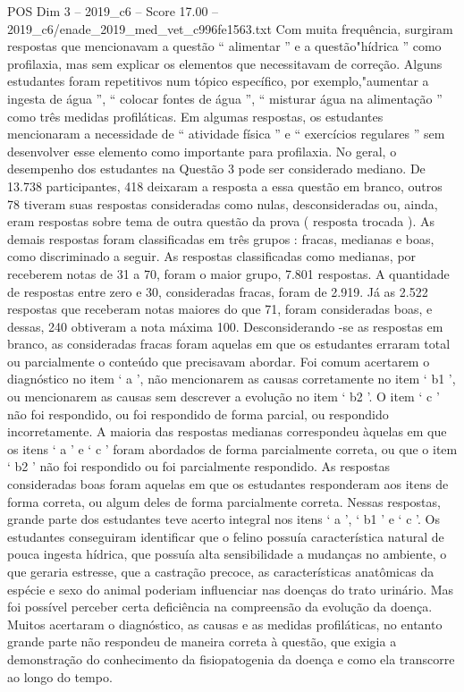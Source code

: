 \begin{textsample}{POS Dim 3 – 2019\_c6 – Score 17.00 – 2019\_c6/enade\_2019\_med\_vet\_c996fe1563.txt}
Com muita frequência, surgiram respostas que mencionavam a questão “ alimentar ” e a questão"hídrica ” como profilaxia, mas sem explicar os elementos que necessitavam de correção.
Alguns estudantes foram repetitivos num tópico específico, por exemplo,"aumentar a ingesta de água ”, “ colocar fontes de água ”, “ misturar água na alimentação ” como três medidas profiláticas.
Em algumas respostas, os estudantes mencionaram a necessidade de “ atividade física ” e “ exercícios regulares ” sem desenvolver esse elemento como importante para profilaxia.
No geral, o desempenho dos estudantes na Questão 3 pode ser considerado mediano.
De 13.738 participantes, 418 deixaram a resposta a essa questão em branco, outros 78 tiveram suas respostas consideradas como nulas, desconsideradas ou, ainda, eram respostas sobre tema de outra questão da prova ( resposta trocada ).
As demais respostas foram classificadas em três grupos : fracas, medianas e boas, como discriminado a seguir.
As respostas classificadas como medianas, por receberem notas de 31 a 70, foram o maior grupo, 7.801 respostas.
A quantidade de respostas entre zero e 30, consideradas fracas, foram de 2.919.
Já as 2.522 respostas que receberam notas maiores do que 71, foram consideradas boas, e dessas, 240 obtiveram a nota máxima 100.
Desconsiderando -se as respostas em branco, as consideradas fracas foram aquelas em que os estudantes erraram total ou parcialmente o conteúdo que precisavam abordar.
Foi comum acertarem o diagnóstico no item ‘ a ’, não mencionarem as causas corretamente no item ‘ b1 ’, ou mencionarem as causas sem descrever a evolução no item ‘ b2 ’.
O item ‘ c ’ não foi respondido, ou foi respondido de forma parcial, ou respondido incorretamente.
A maioria das respostas medianas correspondeu àquelas em que os itens ‘ a ’ e ‘ c ’ foram abordados de forma parcialmente correta, ou que o item ‘ b2 ’ não foi respondido ou foi parcialmente respondido.
As respostas consideradas boas foram aquelas em que os estudantes responderam aos itens de forma correta, ou algum deles de forma parcialmente correta.
Nessas respostas, grande parte dos estudantes teve acerto integral nos itens ‘ a ’, ‘ b1 ’ e ‘ c ’.
Os estudantes conseguiram identificar que o felino possuía característica natural de pouca ingesta hídrica, que possuía alta sensibilidade a mudanças no ambiente, o que geraria estresse, que a castração precoce, as características anatômicas da espécie e sexo do animal poderiam influenciar nas doenças do trato urinário.
Mas foi possível perceber certa deficiência na compreensão da evolução da doença.
Muitos acertaram o diagnóstico, as causas e as medidas profiláticas, no entanto grande parte não respondeu de maneira correta à questão, que exigia a demonstração do conhecimento da fisiopatogenia da doença e como ela transcorre ao longo do tempo.

\end{textsample}
